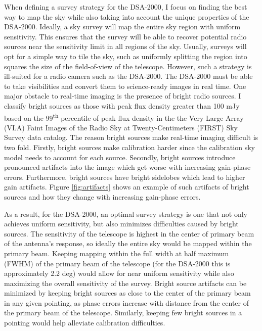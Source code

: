 \documentclass{article}
\begin{document}
\begin{multicols*}{2}
When defining a survey strategy for the DSA-2000, I focus on finding the best way to map the sky while also taking into account the unique properties of the DSA-2000. Ideally, a sky survey will map the entire sky region with uniform sensitivity. This ensures that the survey will be able to recover potential radio sources near the sensitivity limit in all regions of the sky. Usually, surveys will opt for a simple way to tile the sky, such as uniformly splitting the region into squares the size of the field-of-view of the telescope. However, such a strategy is ill-suited for a radio camera such as the DSA-2000. The DSA-2000 must be able to take visibilities and convert them to science-ready images in real time. One major obstacle to real-time imaging is the presence of bright radio sources. I classify bright sources as those with peak flux density greater than 100 mJy based on the 99\textsuperscript{th} percentile of peak flux density in the the Very Large Array (VLA) Faint Images of the Radio Sky at Twenty-Centimeters (FIRST) Sky Survey \cite{FIRST} data catalog. The reason bright sources make real-time imaging difficult is two fold. Firstly, bright sources make calibration harder since the calibration sky model needs to account for each source. Secondly, bright sources introduce pronounced artifacts into the image which get worse with increasing gain-phase errors. Furthermore, bright sources have bright sidelobes which lead to higher gain artifacts. Figure \ref{fig:artifacts} shows an example of such artifacts of bright sources and how they change with increasing gain-phase errors.

As a result, for the DSA-2000, an optimal survey strategy is one that not only achieves uniform sensitivity, but also minimizes difficulties caused by bright sources. The sensitivity of the telescope is highest in the center of primary beam of the antenna's response, so ideally the entire sky would be mapped within the primary beam. Keeping mapping within the full width at half maximum (FWHM) of the primary beam of the telescope (for the DSA-2000 this is approximately 2.2 deg) would allow for near uniform sensitivity while also maximizing the overall sensitivity of the survey. Bright source artifacts can be minimized by keeping bright sources as close to the center of the primary beam in any given pointing, as phase errors increase with distance from the center of the primary beam of the telescope. Similarly, keeping few bright sources in a pointing would  help alleviate calibration difficulties.


\end{multicols*}
\end{document}
